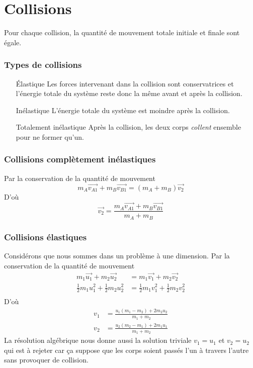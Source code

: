 \part{Collisions}
Pour chaque collision,
la quantité de mouvement totale initiale et finale sont égale.
\section{Types de collisions}
\begin{itemize}
  \item [Élastique]
    Les forces intervenant dans la collision sont conservatrices
    et l'énergie totale du système reste donc
    la même avant et après la collision.
  \item [Inélastique]
    L'énergie totale du système est moindre après la collision.
  \item [Totalement inélastique]
    Après la collision,
    les deux corps \emph{collent} ensemble pour ne former qu'un.
\end{itemize}

\section{Collisions complètement inélastiques}
Par la conservation de la quantité de mouvement
\[ m_A\vec{v_{A1}} + m_B\vec{v_{B1}} = (m_A + m_B)\vec{v_2} \]
D'où
\[ \vec{v_{2}} = \frac{m_A\vec{v_{A1}} + m_B\vec{v_{B1}}}{m_A + m_B} \]

\section{Collisions élastiques}
Considérons que nous sommes dans un problème à une dimension.
Par la conservation de la quantité de mouvement
\begin{align*}
  m_1\vec{u_1} + m_2\vec{u_2} & = m_1\vec{v_1} +  m_2\vec{v_{2}}\\
  \frac{1}{2}m_1u_{1}^2 + \frac{1}{2}m_2u_{2}^2
  & = \frac{1}{2}m_1v_{1}^2 + \frac{1}{2}m_2v_{2}^2\\
\end{align*}
D'où
\begin{align*}
  v_1 & = \frac{u_1(m_1 - m_2) + 2m_2u_2}{m_1 + m_2}\\
  v_2 & = \frac{u_2(m_2 - m_1) + 2m_1u_1}{m_1 + m_2}
\end{align*}
La résolution algébrique nous donne aussi la solution triviale
$v_1 = u_1$ et $v_2 = u_2$ qui est à rejeter car ça suppose que
les corps soient passés l'un à travers l'autre sans provoquer de collision.


